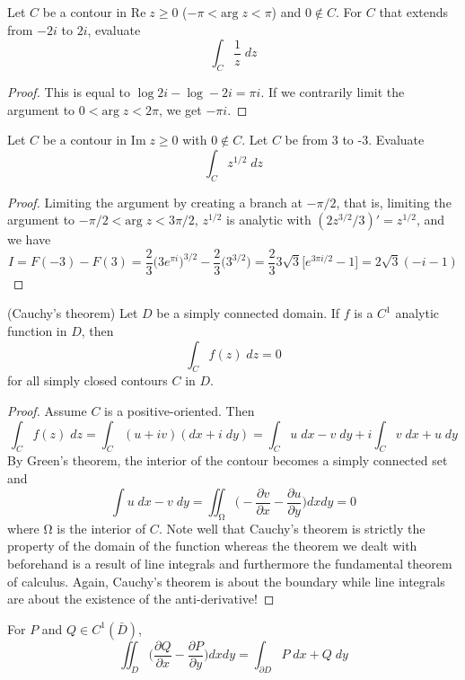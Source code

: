 \vspace{2ex}
\begin{ex}
Let $C$ be a contour in $\mathrm{Re}\;z\geq 0$ ($-\pi <\mathrm{arg}\;z<\pi $) and $0\notin C$. For $C$ that extends from $-2i$ to $2i$, evaluate
\[\int _{C}\dfrac{1}{z}\;dz\]
\end{ex}
\vspace{2ex}
\begin{proof}
This is equal to $\log 2i-\log -2i=\pi i$. If we contrarily limit the argument to $0<\mathrm{arg}\;z<2\pi $, we get $-\pi i$.
\end{proof}
\vspace{2ex}
\begin{ex}
Let $C$ be a contour in $\mathrm{Im}\;z\geq 0$ with $0\notin C$. Let $C$ be from 3 to -3. Evaluate
\[\int _{C}z^{1/2}\;dz\]
\end{ex}
\vspace{2ex}
\begin{proof}
Limiting the argument by creating a branch at $-\pi /2$, that is, limiting the argument to $-\pi /2<\mathrm{arg}\;z<3\pi /2$, $z^{1/2}$ is analytic with $(2z^{3/2}/3)'=z^{1/2}$, and we have
\[I=F(-3)-F(3)=\dfrac{2}{3}\Big(3e^{\pi i}\Big)^{3/2}-\dfrac{2}{3}\Big(3^{3/2}\Big)=\dfrac{2}{3}3\sqrt{3}\Big[e^{3\pi i/2}-1\Big]=2\sqrt{3}(-i-1)\]
\end{proof}
\vspace{2ex}
\begin{thm}
(Cauchy's theorem) Let $D$ be a simply connected domain. If $f$ is a $C^{1}$ analytic function in $D$, then
\[\int _{C}f(z)\;dz=0\]
for all simply closed contours $C$ in $D$. 
\end{thm}
\vspace{2ex}
\begin{proof}
Assume $C$ is a positive-oriented. Then 
\[\int _{C}f(z)\;dz=\int _{C}(u+iv)(dx+i\;dy)=\int _{C}u\;dx-v\;dy+i\int _{C}v\;dx+u\;dy\]
By Green's theorem, the interior of the contour becomes a simply connected set and
\[\int u\;dx-v\;dy=\iint_{\mathrm{\Omega} }\Big(-\dfrac{\partial v}{\partial x}-\dfrac{\partial u}{\partial y}  \Big)dxdy =0\]
where $\mathrm{\Omega} $ is the interior of $C$. Note well that Cauchy's theorem is strictly the property of the domain of the function whereas the theorem we dealt with beforehand is a result of line integrals and furthermore the fundamental theorem of calculus. Again, Cauchy's theorem is about the boundary while line integrals are about the existence of the anti-derivative!
\end{proof}
\vspace{2ex}
\begin{rmk}
For $P$ and $Q\in C^{1}(\bar{D})$,
\[\iint_{D}\Big(\dfrac{\partial Q}{\partial x}-\dfrac{\partial P}{\partial y}\Big)dxdy=\int _{\partial D}P\;dx+Q\;dy\]
\end{rmk}
\vspace{2ex}

